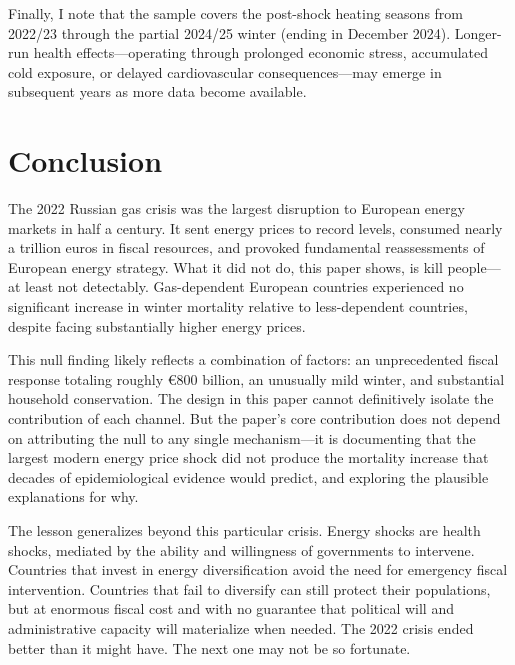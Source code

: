 \documentclass[12pt]{article}
\begin{document}
Finally, I note that the sample covers the post-shock heating seasons from 2022/23 through the partial 2024/25 winter (ending in December 2024). Longer-run health effects---operating through prolonged economic stress, accumulated cold exposure, or delayed cardiovascular consequences---may emerge in subsequent years as more data become available.


\section{Conclusion}
\label{sec:conclusion}

The 2022 Russian gas crisis was the largest disruption to European energy markets in half a century. It sent energy prices to record levels, consumed nearly a trillion euros in fiscal resources, and provoked fundamental reassessments of European energy strategy. What it did not do, this paper shows, is kill people---at least not detectably. Gas-dependent European countries experienced no significant increase in winter mortality relative to less-dependent countries, despite facing substantially higher energy prices.

This null finding likely reflects a combination of factors: an unprecedented fiscal response totaling roughly \euro 800 billion, an unusually mild winter, and substantial household conservation. The design in this paper cannot definitively isolate the contribution of each channel. But the paper's core contribution does not depend on attributing the null to any single mechanism---it is documenting that the largest modern energy price shock did not produce the mortality increase that decades of epidemiological evidence would predict, and exploring the plausible explanations for why.

The lesson generalizes beyond this particular crisis. Energy shocks are health shocks, mediated by the ability and willingness of governments to intervene. Countries that invest in energy diversification avoid the need for emergency fiscal intervention. Countries that fail to diversify can still protect their populations, but at enormous fiscal cost and with no guarantee that political will and administrative capacity will materialize when needed. The 2022 crisis ended better than it might have. The next one may not be so fortunate.


\end{document}
